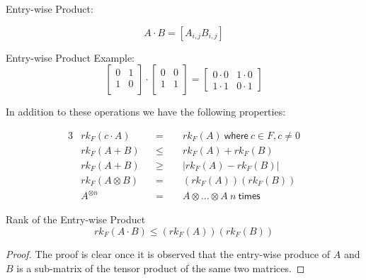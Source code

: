 \documentclass[usletter]{article}
\newcommand{\matrixB}[0]{
    \begin{bmatrix}
      0 & 0 \\
      1 & 1 \\
    \end{bmatrix}
}
\begin{document}
\begin{definition}
  Entry-wise Product:

  \begin{equation*}
    A \cdot B = [A_{i,j}B_{i,j}]
  \end{equation*}
\end{definition}

\begin{example}
  Entry-wise Product Example:
  \begin{equation*}
    \begin{bmatrix}
      0 & 1 \\
      1 & 0 \\
    \end{bmatrix}
    \cdot
    \matrixB
    =
    \begin{bmatrix}
      0 \cdot 0 & 1 \cdot 0 \\
      1 \cdot 1 & 0 \cdot 1
    \end{bmatrix}
  \end{equation*}
\end{example}

In addition to these operations we have the following properties:

\begin{fact}
\begin{alignat*}{3}
  &rk_{F}(c \cdot A)   && = \, \, &&rk_{F}(A)\ \mathsf{where}\ c \in F, c \neq 0 \\
  &rk_{F}(A + B)       &&\leq &&rk_{F}(A) + rk_{F}(B) \\
  &rk_{F}(A + B)       &&\geq &&|rk_{F}(A) - rk_{F}(B)| \\
  &rk_{F}(A \otimes B) &&= &&(rk_{F}(A))(rk_{F}(B)) \\
  & A^{\otimes n}      &&= &&A \otimes \ldots \otimes A\ n\ \mathsf{times}
\end{alignat*}
\end{fact}

\begin{proposition}
  Rank of the Entry-wise Product
  \begin{equation*}
    rk_{F}(A \cdot B) \leq (rk_{F}(A))(rk_{F}(B))
  \end{equation*}
\end{proposition}

\begin{proof}
  The proof is clear once it is observed that the entry-wise produce of $A$ and $B$ is a sub-matrix of the tensor product of the same two matrices.
\end{proof}
\end{document}
